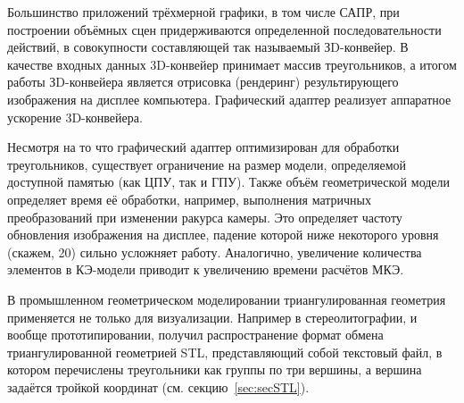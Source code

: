 
Большинство приложений трёхмерной графики, в том числе САПР, при построении объёмных сцен придерживаются определенной последо­вательности действий, в совокупности составляющей так называемый ЗD-конвейер. В качестве входных данных 3D-конвейер принимает массив треугольников, а итогом работы ЗD-конвейера является отрисовка (рендеринг) резуль­тирующего изображения на дисплее компьютера. Графический адаптер реализует аппаратное ускорение 3D-конвейера.

Несмотря на то что графический адаптер оптимизирован для обработки треугольников, существует ограничение на размер модели, определяемой доступной памятью (как ЦПУ, так и ГПУ). Также объём геометрической модели определяет время её обработки, например, выполнения матричных преобразований при изменении ракурса камеры. Это определяет частоту обновления изображения на дисплее, падение которой ниже некоторого уровня (\todo скажем, 20) сильно усложняет работу. Аналогично, увеличение количества элементов в КЭ-модели приводит к увеличению времени расчётов МКЭ.



В промышленном геометрическом моделировании триангулированная геометрия применяется не только для визуализации. Например в стереолитографии, и вообще прототипировании, получил распространение формат обмена триангулированной геометрией STL, представляющий собой текстовый файл, в котором перечислены треугольники как группы по три вершины, а вершина задаётся тройкой координат (см. секцию~\ref{sec:secSTL}).


